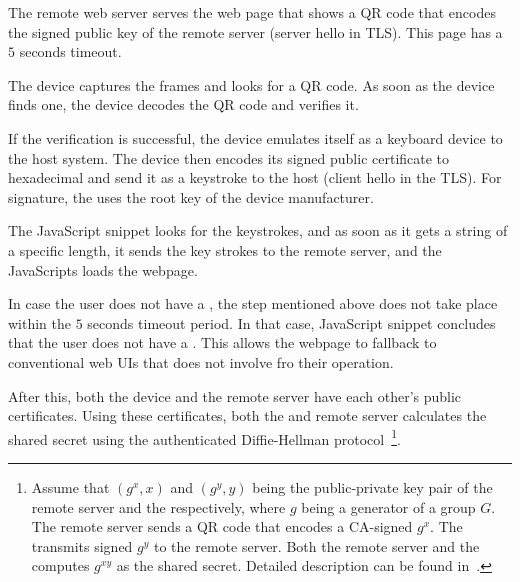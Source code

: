 \begin{mylist}
  \item The remote web server serves the web page that shows a QR code that encodes the signed public key of the remote server (server hello in TLS). This page has a $5$ seconds timeout.
  \item The device captures the frames and looks for a QR code. As soon as the device finds one, the device decodes the QR code and verifies it.
  \item If the verification is successful, the device emulates itself as a keyboard device to the host system. The device then encodes its signed public certificate to hexadecimal and send it as a keystroke to the host (client hello in the TLS). For signature, the \device uses the root key of the device manufacturer.
  \item The \name  JavaScript snippet looks for the keystrokes, and as soon as it gets a string of a specific length, it sends the key strokes to the remote server, and the \name JavaScripts loads the webpage.
  \item In case the user does not have a \device, the step mentioned above does not take place within the $5$ seconds timeout period. In that case, \name JavaScript snippet concludes that the user does not have a \device. This allows the webpage to fallback to conventional web UIs that does not involve \device fro their operation.
\end{mylist}

After this, both the device and the remote server have each other's public certificates. Using these certificates, both the \device and remote server calculates the shared secret using the authenticated Diffie-Hellman protocol~\footnote{Assume that $(g^x, x)$ and $(g^y, y)$ being the public-private key pair of the remote server and the \device respectively, where $g$ being a generator of a group $G$. The remote server sends a QR code that encodes a CA-signed $g^x$. The \device transmits signed $g^y$ to the remote server. Both the remote server and the \device computes $g^{xy}$ as the shared secret. Detailed description can be found  in~\cite{blake1998authenticated}.}.
